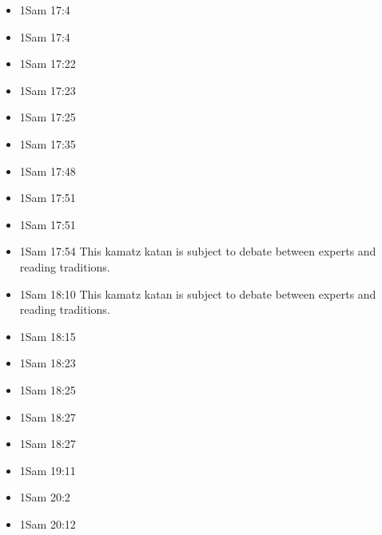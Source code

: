 \documentclass[14pt]{article}
\begin{document}
\begin{multicols}{2}
\begin{itemize}
							\item 1Sam 17:4
							
							\item 1Sam 17:4
							
							\item 1Sam 17:22
							
							\item 1Sam 17:23
							
							\item 1Sam 17:25
							
							\item 1Sam 17:35
							
							\item 1Sam 17:48
							
							\item 1Sam 17:51
							
							\item 1Sam 17:51
							
							\item 1Sam 17:54 This kamatz katan is subject to debate between experts and reading traditions.
							
							\item 1Sam 18:10 This kamatz katan is subject to debate between experts and reading traditions.
							
							\item 1Sam 18:15
							
							\item 1Sam 18:23
							
							\item 1Sam 18:25
							
							\item 1Sam 18:27
							
							\item 1Sam 18:27
							
							\item 1Sam 19:11
							
							\item 1Sam 20:2
							
							\item 1Sam 20:12
							

\end{itemize}
\end{multicols}
\end{document}
